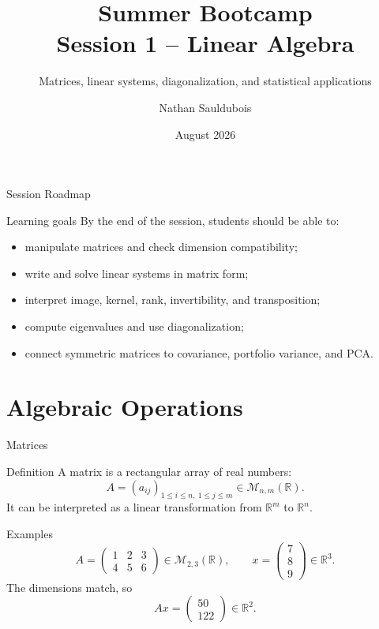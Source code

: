 \documentclass[aspectratio=169]{beamer}
\title[Session 1 -- Linear Algebra]{Summer Bootcamp\\Session 1 -- Linear Algebra}
\subtitle{Matrices, linear systems, diagonalization, and statistical applications}
\author{Nathan Sauldubois}
\institute{NYU Finance and Risk Engineering}
\date{August 2026}
\newcommand{\R}{\mathbb{R}}
\newcommand{\M}{\mathcal{M}}
\begin{document}
\begin{frame}
  \titlepage
\end{frame}

\begin{frame}{Session Roadmap}
\begin{block}{Learning goals}
By the end of the session, students should be able to:
\begin{itemize}
  \item manipulate matrices and check dimension compatibility;
  \item write and solve linear systems in matrix form;
  \item interpret image, kernel, rank, invertibility, and transposition;
  \item compute eigenvalues and use diagonalization;
  \item connect symmetric matrices to covariance, portfolio variance, and PCA.
\end{itemize}
\end{block}
\end{frame}

\section{Algebraic Operations}

\begin{frame}[shrink=5]{Matrices}
\begin{block}{Definition}
A matrix is a rectangular array of real numbers:
\[
A=(a_{ij})_{1\le i\le n,\ 1\le j\le m}\in \M_{n,m}(\R).
\]
It can be interpreted as a linear transformation from $\R^m$ to $\R^n$.
\end{block}
\pause
\begin{exampleblock}{Examples}
\[
 A=\begin{pmatrix}1&2&3\\4&5&6\end{pmatrix}\in \M_{2,3}(\R),
 \qquad
 x=\begin{pmatrix}7\\8\\9\end{pmatrix}\in \R^3.
\]
The dimensions match, so
\[
Ax=\begin{pmatrix}50\\122\end{pmatrix}\in\R^2.
\]
\end{exampleblock}
\end{frame}
\end{document}
